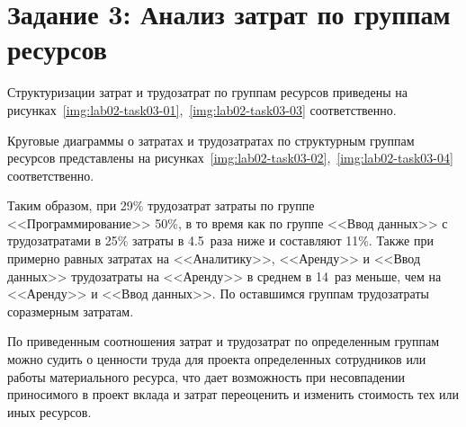 \section{Задание 3: Анализ затрат по группам ресурсов}

Структуризации затрат и трудозатрат по группам ресурсов приведены на
рисунках~\ref{img:lab02-task03-01},~\ref{img:lab02-task03-03} соответственно.



Круговые диаграммы о затратах и трудозатратах по структурным группам ресурсов
представлены на рисунках~\ref{img:lab02-task03-02},~\ref{img:lab02-task03-04}
соответственно.



Таким образом, при 29\% трудозатрат затраты по группе <<Программирование>> 50\%,
в то время как по группе <<Ввод данных>> с трудозатратами в
25\% затраты в 4.5~раза ниже и составляют 11\%. Также при примерно равных
затратах на <<Аналитику>>, <<Аренду>> и <<Ввод данных>> трудозатраты на
<<Аренду>> в среднем в 14~раз меньше, чем на <<Аренду>> и <<Ввод данных>>. По
оставшимся группам трудозатраты соразмерным затратам.

По приведенным соотношения затрат и трудозатрат по определенным группам можно
судить о ценности труда для проекта определенных сотрудников или работы
материального ресурса, что дает возможность при несовпадении приносимого в
проект вклада и затрат переоценить и изменить стоимость тех или иных ресурсов.
